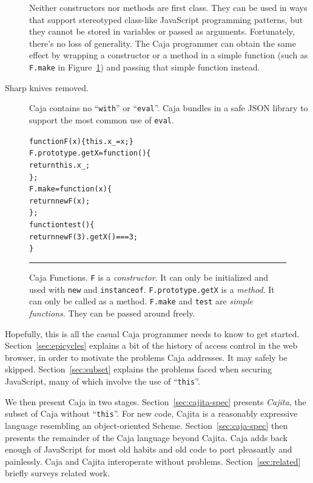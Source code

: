 \documentclass[letterpaper,twocolumn,10pt]{article}
\newcommand{\code}[1]{{\tt {#1}}}              %
\begin{document}
\begin{description}
  Neither constructors nor methods are first class. They can be used in ways 
  that support stereotyped class-like JavaScript programming patterns, but 
  they cannot be stored in variables or passed as arguments. Fortunately, 
  there's no loss of generality. The Caja programmer can obtain the same 
  effect by wrapping a constructor or a method in a simple function (such as 
  \code{F.make} in Figure~\ref{fig:func-obj}) and passing that simple 
  function instead.
 
  \item[Sharp knives removed.] Caja contains no ``\code{with}'' or 
  ``\code{eval}''. Caja bundles in a safe JSON library to support the most 
  common use of \code{eval}.
 
\end{description}

\begin{figure}[t!]
\begin{alltt}
function F(x) \{ this.x_ = x; \}
F.prototype.getX = function() \{
  return this.x_;
\};
F.make = function(x) \{
  return new F(x);
\};
function test() \{
  return new F(3).getX() === 3;
\}
\end{alltt}

\caption[Caja Functions]{Caja Functions. \code{F} is a \emph{constructor}. It 
can only be initialized and used with \code{new} and \code{instanceof}. 
\code{F.prototype.getX} is a \emph{method}. It can only be called as a 
method. \code{F.make} and \code{test} are \emph{simple functions}. They can 
be passed around freely. \\ } \hrule
\label{fig:func-obj}
\end{figure}

Hopefully, this is all the casual Caja programmer needs to know to get 
started. Section~\ref{sec:epicycles} explains a bit of the history of access 
control in the web browser, in order to motivate the problems Caja addresses. 
It may safely be skipped. Section~\ref{sec:subset} explains the problems 
faced when securing JavaScript, many of which involve the use of 
``\code{this}''. 

We then present Caja in two stages. Section~\ref{sec:cajita-spec} presents 
\emph{Cajita}, the subset of Caja without ``\code{this}''. For new code, 
Cajita is a reasonably expressive language resembling an object-oriented 
Scheme. Section~\ref{sec:caja-spec} then presents the remainder of the Caja 
language beyond Cajita. Caja adds back enough of JavaScript for most old 
habits and old code to port pleasantly and painlessly. Caja and Cajita 
interoperate without problems. Section~\ref{sec:related} briefly surveys
related work.
\end{document}
